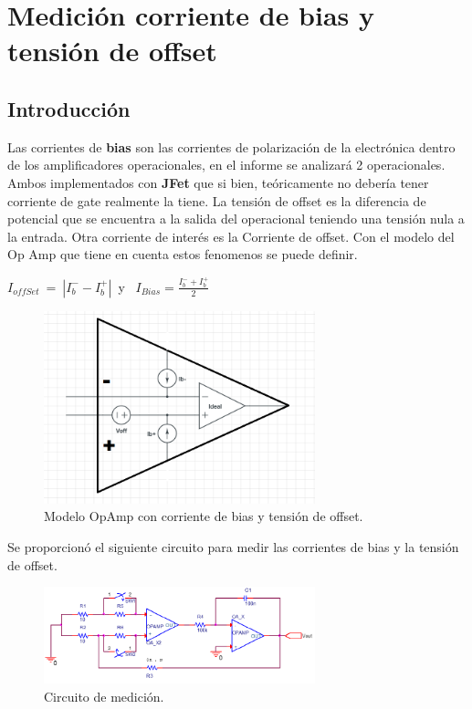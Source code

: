 
\section{Medici\'on corriente de bias y tensi\'on de offset}

\subsection{Introducción}
Las corrientes de \textbf{bias} son las corrientes de polarización de la electrónica dentro de los amplificadores operacionales, en el informe se analizará 2 operacionales. Ambos implementados con \textbf{JFet} que si bien, teóricamente no debería tener corriente de gate realmente la tiene.
La tensión de offset es la diferencia de potencial que se encuentra a la salida del operacional teniendo una tensión nula a la entrada.
Otra corriente de interés es la Corriente de offset.
Con el modelo del Op Amp que tiene en cuenta estos fenomenos se puede definir.\newline
 	
 $I_{offSet} \ = \ |I_b^{-}-I_b^{+}|$\ y \ $I_{Bias}= \frac{I_b^-+I_b^{+}}{2}$
\begin{figure}[H]	
	\centering
	\includegraphics[width=0.7\textwidth]{imagenes/opampReal.PNG}
	\caption{Modelo OpAmp con corriente de bias y tensión de offset.}
	\label{fig:OpampBias}
\end{figure}



Se proporcionó el siguiente circuito para medir las corrientes de bias y la tensión de offset.

\begin{figure}[H]	
	\centering
	\includegraphics[width=0.7\textwidth]{imagenes/CircMedicion.PNG}
	\caption{Circuito de medición.}
	\label{fig:CircMedicion}
\end{figure}

